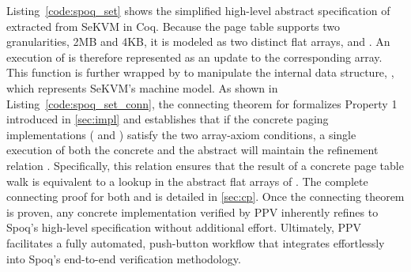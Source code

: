 Listing~\ref{code:spoq_set} shows the simplified high-level abstract specification of  extracted from SeKVM in Coq. Because the page table supports two granularities, 2MB and 4KB, it is modeled as two distinct flat arrays,  and . An execution of  is therefore represented as an update to the corresponding array. This function is further wrapped by  to manipulate the internal data structure, , which represents SeKVM's machine model. As shown in Listing~\ref{code:spoq_set_conn}, the connecting theorem for  formalizes Property 1 introduced in \autoref{sec:impl} and establishes that if the concrete paging implementations ( and ) satisfy the two array-axiom conditions, a single execution of both the concrete  and the abstract  will maintain the refinement relation . Specifically, this relation  ensures that the result of a concrete page table walk is equivalent to a lookup in the abstract flat arrays of . The complete connecting proof for both  and  is detailed in \autoref{sec:cp}. Once the connecting theorem is proven, any concrete implementation verified by PPV inherently refines to Spoq's high-level specification without additional effort. Ultimately, PPV facilitates a fully automated, push-button workflow that integrates effortlessly into Spoq’s end-to-end verification methodology.

